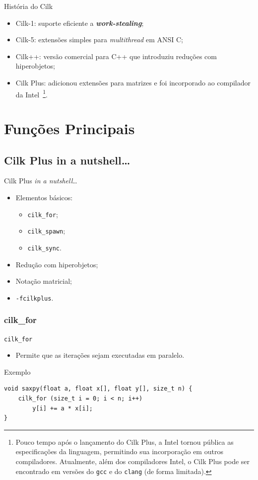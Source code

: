 \documentclass{beamer}
\begin{document}
\begin{frame}{História do Cilk}
\begin{itemize}
    \item Cilk-1: suporte eficiente a \textbf{\textit{work-stealing}};
    \item Cilk-5: extensões simples para \textit{multithread} em ANSI C\@;
    \item Cilk++: versão comercial para C++ que introduziu reduções com
    hiperobjetos;
    \item Cilk Plus: adicionou extensões para matrizes e foi incorporado ao
    compilador da Intel~\footnote{Pouco tempo após o lançamento do Cilk Plus, a
    Intel tornou pública as especificações da linguagem, permitindo sua
    incorporação em outros compiladores. Atualmente, além dos compiladores Intel,
    o Cilk Plus pode ser encontrado em versões do \texttt{gcc} e
    do \texttt{clang} (de forma limitada).}.
\end{itemize}
\end{frame}

\section{Funções Principais}
\subsection{Cilk Plus in a nutshell\ldots}
\begin{frame}{Cilk Plus \textit{in a nutshell}\ldots}
\begin{itemize}
    \item Elementos básicos:
    \begin{itemize}
        \item \texttt{cilk\_for};
        \item \texttt{cilk\_spawn};
        \item \texttt{cilk\_sync}.
    \end{itemize}
    \item Redução com hiperobjetos;
    \item Notação matricial;
    \item \texttt{-fcilkplus}.
\end{itemize}
\end{frame}
\subsubsection{cilk\_for}
\begin{frame}[fragile]{\texttt{cilk\_for}}
\begin{itemize}
    \item Permite que as iterações sejam executadas em paralelo.
\end{itemize}
\begin{block}{Exemplo}
\begin{lstlisting}
void saxpy(float a, float x[], float y[], size_t n) {
    cilk_for (size_t i = 0; i < n; i++)
        y[i] += a * x[i];
}
\end{lstlisting}
\end{block}
\end{frame}
\end{document}

